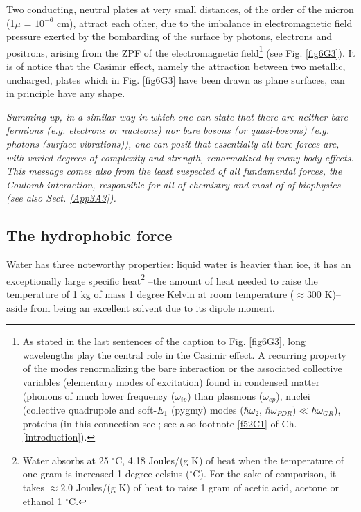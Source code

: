\begin{subappendices}
Two conducting,
neutral plates at very small distances, of the order of the micron (1$\mu$ = $10^{-6}$ cm), attract each
other, due to the imbalance in electromagnetic field pressure exerted by the bombarding
of  the surface by photons, electrons and positrons, arising from the ZPF of the electromagnetic field\footnote{As stated in the last sentences of the caption to Fig. \ref{fig6G3}, long wavelengths play the central role in the Casimir effect. A recurring property of the modes renormalizing the bare interaction or the associated collective variables (elementary modes of excitation) found in condensed matter (phonons of much lower frequency ($\omega_{ip}$) than plasmons ($\omega_{ep}$), nuclei (collective quadrupole and soft-$E_1$ (pygmy) modes ($\hbar\omega_2$, $\hbar\omega_{PDR})\ll\hbar\omega_{GR}$), proteins (in this connection see \cite{Micheletti:04,Micheletti:01,Micheletti:02,Hamacher:10}; see also footnote \ref{f52C1} of Ch. \ref{introduction}).}
(see Fig. \ref{fig6G3}). It is of notice that the Casimir effect, namely the attraction between two metallic,
uncharged, plates which in Fig. \ref{fig6G3} have been drawn  as plane surfaces, can in
principle have any shape. 

\emph{Summing up, in a similar way in which one can state that there are neither bare fermions (e.g. electrons or nucleons) nor bare  bosons (or quasi-bosons) (e.g. photons  (surface vibrations)),  one can posit that essentially all  bare
forces are, with varied degrees of complexity and strength, renormalized 
by many-body effects. This message comes also from  the least suspected of all fundamental forces, the Coulomb interaction, responsible for all of chemistry and most of of biophysics (see also  Sect. \ref{App3A3}).}
\subsection{The hydrophobic force}
Water has three noteworthy properties: liquid water is heavier than ice, it has an exceptionally large specific heat\footnote{Water absorbs  at 25 $^\circ$C, 4.18 Joules/(g K) of heat when the temperature of one gram is increased 1 degree celsius ($^\circ$C). For the sake of comparison, it takes $\approx 2.0$ Joules/(g K) of heat to raise 1 gram of acetic acid, acetone or ethanol 1 $^\circ$C.} --the amount of heat needed to raise the temperature of 1 kg of mass 1 degree Kelvin at room temperature ($\approx$300 K)-- aside from being an excellent solvent due to its dipole moment.



\end{subappendices}
